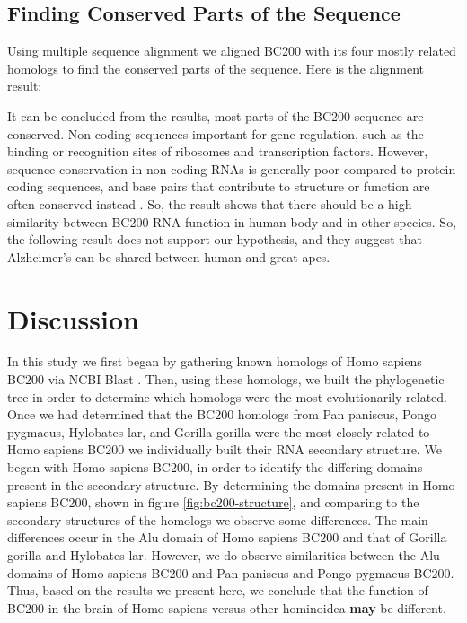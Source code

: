 \documentclass[conference, 11pt]{IEEEtran}
\begin{document}
\subsection{Finding Conserved Parts of the Sequence}


Using multiple sequence alignment we aligned BC200 with its four mostly related homologs to find the conserved parts of the sequence.
Here is the alignment result:


It can be concluded from the results, most parts of the BC200 sequence are conserved. 
Non-coding sequences important for gene regulation, such as the binding or recognition sites of ribosomes and transcription factors. 
However, sequence conservation in non-coding RNAs is generally poor compared to protein-coding sequences, and base pairs that contribute to structure or function are often conserved instead \cite{johnsson2014evolutionary}. 
So, the result shows that there should be a high similarity between BC200 RNA function in human body and in other species. 
So, the following result does not support our hypothesis, and they suggest that Alzheimer’s can be shared between human and great apes.

\section{Discussion}\label{sec:discussion}

In this study we first began by gathering known homologs of Homo sapiens BC200 via NCBI Blast \cite{blastTool,madden2012blast}. 
Then, using these homologs, we built the phylogenetic tree in order to determine which homologs were the most evolutionarily related. 
Once we had determined that the BC200 homologs from Pan paniscus, Pongo pygmaeus, Hylobates lar, and Gorilla gorilla were the most closely related to Homo sapiens BC200 we individually built their RNA secondary structure. 
We began with Homo sapiens BC200, in order to identify the differing domains present in the secondary structure. 
By determining the domains present in Homo sapiens BC200, shown in figure \ref{fig:bc200-structure}, and comparing to the secondary structures of the homologs we observe some differences. 
The main differences occur in the Alu domain of Homo sapiens BC200 and that of Gorilla gorilla and Hylobates lar. 
However, we do observe similarities between the Alu domains of Homo sapiens BC200 and Pan paniscus and Pongo pygmaeus BC200. 
Thus, based on the results we present here, we conclude that the function of BC200 in the brain of Homo sapiens versus other hominoidea \textbf{may} be different. 
\end{document}
